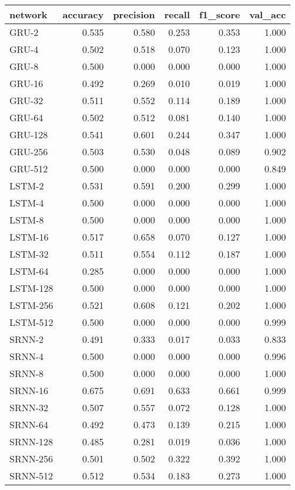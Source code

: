 \begin{tabular}{lrrrrr}
\toprule
  network &  accuracy &  precision &  recall &  f1\_score &  val\_acc \\
\midrule
    GRU-2 &     0.535 &      0.580 &   0.253 &     0.353 &    1.000 \\
    GRU-4 &     0.502 &      0.518 &   0.070 &     0.123 &    1.000 \\
    GRU-8 &     0.500 &      0.000 &   0.000 &     0.000 &    1.000 \\
   GRU-16 &     0.492 &      0.269 &   0.010 &     0.019 &    1.000 \\
   GRU-32 &     0.511 &      0.552 &   0.114 &     0.189 &    1.000 \\
   GRU-64 &     0.502 &      0.512 &   0.081 &     0.140 &    1.000 \\
  GRU-128 &     0.541 &      0.601 &   0.244 &     0.347 &    1.000 \\
  GRU-256 &     0.503 &      0.530 &   0.048 &     0.089 &    0.902 \\
  GRU-512 &     0.500 &      0.000 &   0.000 &     0.000 &    0.849 \\
   LSTM-2 &     0.531 &      0.591 &   0.200 &     0.299 &    1.000 \\
   LSTM-4 &     0.500 &      0.000 &   0.000 &     0.000 &    1.000 \\
   LSTM-8 &     0.500 &      0.000 &   0.000 &     0.000 &    1.000 \\
  LSTM-16 &     0.517 &      0.658 &   0.070 &     0.127 &    1.000 \\
  LSTM-32 &     0.511 &      0.554 &   0.112 &     0.187 &    1.000 \\
  LSTM-64 &     0.285 &      0.000 &   0.000 &     0.000 &    1.000 \\
 LSTM-128 &     0.500 &      0.000 &   0.000 &     0.000 &    1.000 \\
 LSTM-256 &     0.521 &      0.608 &   0.121 &     0.202 &    1.000 \\
 LSTM-512 &     0.500 &      0.000 &   0.000 &     0.000 &    0.999 \\
   SRNN-2 &     0.491 &      0.333 &   0.017 &     0.033 &    0.833 \\
   SRNN-4 &     0.500 &      0.000 &   0.000 &     0.000 &    0.996 \\
   SRNN-8 &     0.500 &      0.000 &   0.000 &     0.000 &    1.000 \\
  SRNN-16 &     0.675 &      0.691 &   0.633 &     0.661 &    0.999 \\
  SRNN-32 &     0.507 &      0.557 &   0.072 &     0.128 &    1.000 \\
  SRNN-64 &     0.492 &      0.473 &   0.139 &     0.215 &    1.000 \\
 SRNN-128 &     0.485 &      0.281 &   0.019 &     0.036 &    1.000 \\
 SRNN-256 &     0.501 &      0.502 &   0.322 &     0.392 &    1.000 \\
 SRNN-512 &     0.512 &      0.534 &   0.183 &     0.273 &    1.000 \\
\bottomrule
\end{tabular}
